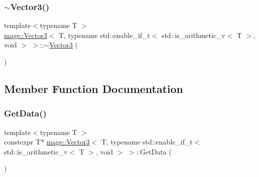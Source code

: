 \subsubsection{\texorpdfstring{$\sim$\+Vector3()}{~Vector3()}}
{\footnotesize\ttfamily template$<$typename T $>$ \\
\hyperlink{structmage_1_1_vector3}{mage\+::\+Vector3}$<$ T, typename std\+::enable\+\_\+if\+\_\+t$<$ std\+::is\+\_\+arithmetic\+\_\+v$<$ T $>$, void $>$ $>$\+::$\sim$\hyperlink{structmage_1_1_vector3}{Vector3} (\begin{DoxyParamCaption}{ }\end{DoxyParamCaption})\hspace{0.3cm}{\ttfamily [default]}}



\subsection{Member Function Documentation}
\hypertarget{structmage_1_1_vector3_3_01_t_00_01typename_01std_1_1enable__if__t_3_01std_1_1is__arithmetic__v_3_01_t_01_4_00_01void_01_4_01_4_a126f56252c9621850e4b857efc390ba2}{}\label{structmage_1_1_vector3_3_01_t_00_01typename_01std_1_1enable__if__t_3_01std_1_1is__arithmetic__v_3_01_t_01_4_00_01void_01_4_01_4_a126f56252c9621850e4b857efc390ba2} 
\subsubsection{\texorpdfstring{Get\+Data()}{GetData()}\hspace{0.1cm}{\footnotesize\ttfamily [1/2]}}
{\footnotesize\ttfamily template$<$typename T $>$ \\
constexpr T$\ast$ \hyperlink{structmage_1_1_vector3}{mage\+::\+Vector3}$<$ T, typename std\+::enable\+\_\+if\+\_\+t$<$ std\+::is\+\_\+arithmetic\+\_\+v$<$ T $>$, void $>$ $>$\+::Get\+Data (\begin{DoxyParamCaption}{ }\end{DoxyParamCaption})\hspace{0.3cm}{\ttfamily [noexcept]}}


